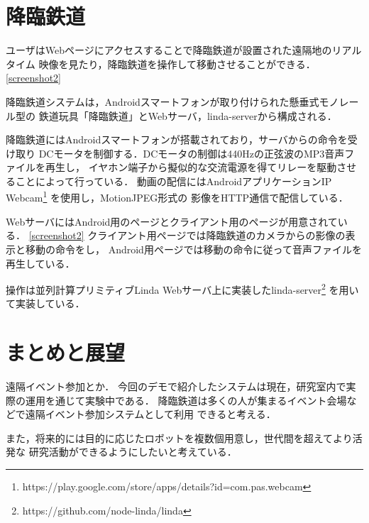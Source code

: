 \documentclass[submit,techreq]{ipsj}
\begin{document}
\section{降臨鉄道}

ユーザはWebページにアクセスすることで降臨鉄道が設置された遠隔地のリアルタイム
映像を見たり，降臨鉄道を操作して移動させることができる．
\ref{screenshot2}

降臨鉄道システムは，Androidスマートフォンが取り付けられた懸垂式モノレール型の
鉄道玩具「降臨鉄道」とWebサーバ，linda-serverから構成される．

降臨鉄道にはAndroidスマートフォンが搭載されており，サーバからの命令を受け取り
DCモータを制御する．DCモータの制御は440Hzの正弦波のMP3音声ファイルを再生し，
イヤホン端子から擬似的な交流電源を得てリレーを駆動させることによって行っている．
動画の配信にはAndroidアプリケーションIP Webcam\footnote{
  \textsf{https://play.google.com/store/apps/details?id=com.pas.webcam}
}
を使用し，MotionJPEG形式の
影像をHTTP通信で配信している．

WebサーバにはAndroid用のページとクライアント用のページが用意されている．
\ref{screenshot2}
クライアント用ページでは降臨鉄道のカメラからの影像の表示と移動の命令をし，
Android用ページでは移動の命令に従って音声ファイルを再生している．

操作は並列計算プリミティブLinda\cite{Carriero:1989:LC:63334.63337}
Webサーバ上に実装したlinda-server\footnote{
  \textsf{https://github.com/node-linda/linda}
}
を用いて実装している．

\section{まとめと展望}

遠隔イベント参加とか．
今回のデモで紹介したシステムは現在，研究室内で実際の運用を通じて実験中である．
降臨鉄道は多くの人が集まるイベント会場などで遠隔イベント参加システムとして利用
できると考える．

また，将来的には目的に応じたロボットを複数個用意し，世代間を超えてより活発な
研究活動ができるようにしたいと考えている．




\end{document}
